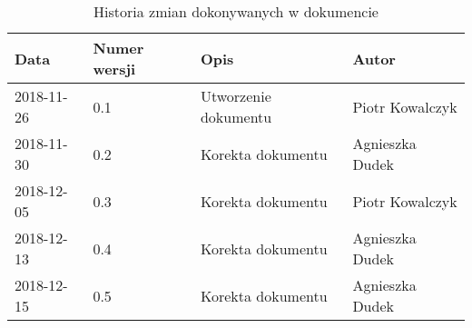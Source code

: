 \documentclass{article}
\begin{document}
\begin{titlepage}







\end{titlepage}

\addtocounter{page}{1}
\newpage

\begin{table}[h!]
	\begin{center}
		\caption{Historia zmian dokonywanych w dokumencie}
		\begin{tabular}{|l|l|l|l|}
			\hline
			Data & Numer wersji & Opis & Autor \\
			\hline \hline
			2018-11-26 & 0.1 & Utworzenie dokumentu & Piotr Kowalczyk \\
			\hline 
			2018-11-30 & 0.2 & Korekta dokumentu & Agnieszka Dudek \\
			\hline
			2018-12-05 & 0.3 & Korekta dokumentu & Piotr Kowalczyk \\
			\hline
			2018-12-13 & 0.4 & Korekta dokumentu & Agnieszka Dudek \\
			\hline
			2018-12-15 & 0.5 & Korekta dokumentu & Agnieszka Dudek \\
			\hline

    \end{tabular}
	\end{center}
\end{table}	
\end{document}
